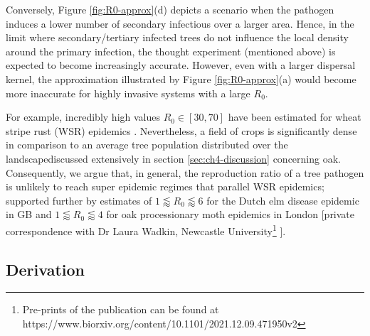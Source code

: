 Conversely, Figure \ref{fig:R0-approx}(d) depicts a scenario when the pathogen induces a lower number of secondary infectious over a larger area. Hence, in the limit where secondary/tertiary infected trees do not influence the local density around the primary infection, the thought experiment (mentioned above) is expected to become increasingly accurate. 
However, even with a larger dispersal kernel, the approximation illustrated by Figure \ref{fig:R0-approx}(a) would become more inaccurate for highly invasive systems with a large $R_0$. 

For example, incredibly high values $R_0\in [30, 70]$ have been estimated for wheat stripe rust (WSR) epidemics \cite{severns2019consequences, mikaberidze2016invasiveness}. Nevertheless, 
a field of crops is significantly dense in comparison to an average tree population distributed over the landscape\textemdash discussed extensively in section \ref{sec:ch4-discussion} concerning oak. Consequently, we argue that, in general, the reproduction ratio of a tree pathogen is unlikely to reach super epidemic regimes that parallel WSR epidemics;
supported further by estimates of $1 \lessapprox R_0 \lessapprox 6$ for the Dutch elm disease epidemic in GB \cite{swinton1996dutch} and $1 \lessapprox R_0 \lessapprox 4$ for oak processionary moth epidemics in London [private correspondence with Dr Laura Wadkin, Newcastle University\footnote{Pre-prints of the publication can be found at https://www.biorxiv.org/content/10.1101/2021.12.09.471950v2} ].

\subsection{Derivation}

